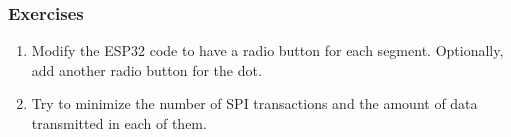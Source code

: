 \subsubsection{Exercises}
\begin{enumerate}[resume]
    \item Modify the ESP32 code to have a radio button for each segment.
    Optionally, add another radio button for the dot.
    \item Try to minimize the number of SPI transactions and the amount of data
    transmitted in each of them.
\end{enumerate}